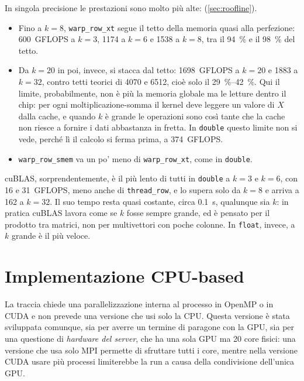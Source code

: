 \documentclass[11pt,a4paper]{article}
\begin{document}
In singola precisione le prestazioni sono molto più alte:
(\cref{sec:roofline}).
\begin{itemize}
  \item Fino a $k = 8$, \texttt{warp\_row\_xt} segue il tetto della memoria quasi
        alla perfezione: 600~GFLOPS a $k = 3$, 1174 a $k = 6$ e 1538 a $k = 8$,
        tra il \SI{94}{\percent} e il \SI{98}{\percent} del tetto.
  \item Da $k = 20$ in poi, invece, si stacca dal tetto: 1698~GFLOPS a $k = 20$
        e 1883 a $k = 32$, contro tetti teorici di 4070 e 6512, cioè solo il
        \SIrange{29}{42}{\percent}. Qui il limite, probabilmente, non è più la
        memoria globale ma le letture dentro il chip: per ogni moltiplicazione-somma il kernel deve
        leggere un valore di $X$ dalla cache, e quando $k$ è grande le operazioni
        sono così tante che la cache non riesce a fornire i dati abbastanza in
        fretta. In \texttt{double} questo limite non si vede, perché lì il
        calcolo si ferma prima, a 374~GFLOPS.
  \item \texttt{warp\_row\_smem} va un po' meno di
        \texttt{warp\_row\_xt}, come in \texttt{double}.
\end{itemize}

cuBLAS, sorprendentemente, è il più lento
di tutti in \texttt{double} a $k = 3$ e $k = 6$, con 16 e 31~GFLOPS, meno anche
di \texttt{thread\_row}, e lo supera solo da $k = 8$ e arriva a 162 a $k = 32$.
Il suo tempo resta quasi costante, circa \SI{0.1}{s}, qualunque sia $k$: in
pratica cuBLAS lavora come se $k$ fosse sempre grande, ed è pensato per il
prodotto tra matrici, non per multivettori con poche colonne. In
\texttt{float}, invece, a $k$ grande è il più veloce.

\section{Implementazione CPU-based}\label{sec:cpu}

La traccia chiede una parallelizzazione interna al processo in OpenMP o in CUDA
e non prevede una versione che usi solo la CPU. Questa versione è stata
sviluppata comunque, sia per averre un termine di paragone con la GPU, 
sia per una questione di \emph{hardware del server},
che ha una sola GPU ma 20 core fisici: una versione che usa solo MPI 
permette di sfruttare tutti i core, mentre nella versione
 CUDA usare più processi limiterebbe la run a causa della condivisione dell'unica GPU.
\end{document}
